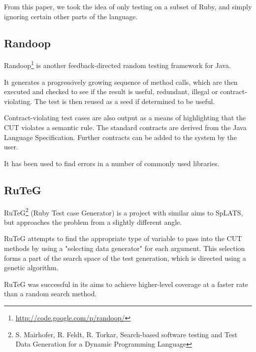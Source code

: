     From this paper, we took the idea of only testing on a subset of Ruby, and 
    simply ignoring certain other parts of the language.


  \subsection{Randoop}
    Randoop\footnote{\url{http://code.google.com/p/randoop/}} is another
feedback-directed random testing framework for Java.

    It generates a progressively growing sequence of method calls, which are
then executed and checked to see if the result is useful, redundant, illegal or
contract-violating. The test is then reused as a seed if determined to be
useful.

    Contract-violating test cases are also output as a means of highlighting
that the CUT violates a semantic rule. The standard contracts are derived from
the Java Language Specification. Further contracts can be added to the system by
the user.

    It has been used to find errors in a number of commonly used libraries.

  \subsection{RuTeG}
    RuTeG\footnote{S. Mairhofer, R. Feldt, R. Torkar, Search-based software
testing and Test Data Generation for a Dynamic Programming Language} (Ruby Test
case Generator) is a project with similar aims to SpLATS, but approaches the
problem from a slightly different angle.

RuTeG attempts to find the appropriate type of variable to pass into the CUT
methods by using a "selecting data generator" for each argument. This selection
forms a part of the search space of the test generation, which is directed using
a genetic algorithm.

RuTeG was successful in its aims to achieve higher-level coverage at a faster
rate than a random search method.
